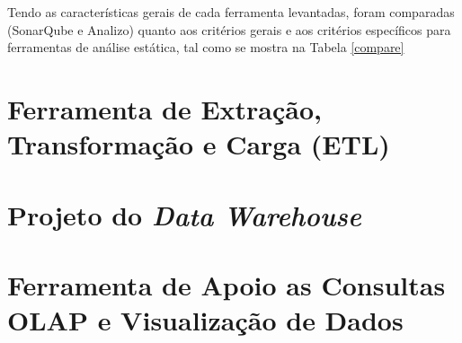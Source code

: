 Tendo as características gerais de cada ferramenta levantadas, foram comparadas (SonarQube e Analizo) quanto aos critérios gerais e aos critérios específicos para ferramentas de análise estática, tal como se mostra na Tabela \ref{compare}



\section{Ferramenta de Extração, Transformação e Carga (ETL)}

\section{Projeto do \textit{Data Warehouse}}

\section{Ferramenta de Apoio as Consultas OLAP e Visualização de Dados}




  
